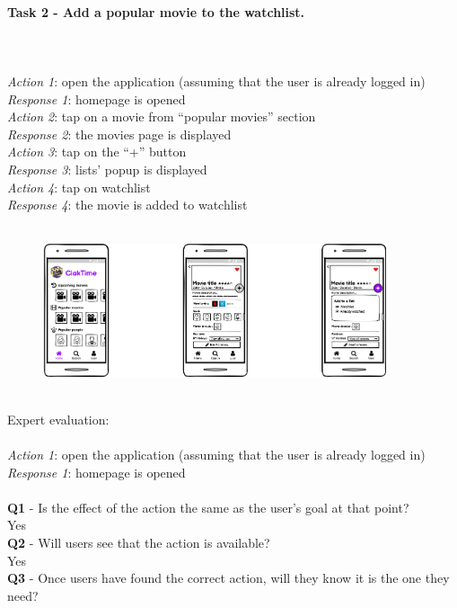 \documentclass[12pt, a4paper]{article}
\numberwithin{figure}{section}
\newcommand\tab[1][1cm]{\hspace*{#1}}
\begin{document}
\paragraph{Task 2 - Add a popular movie to the watchlist.}\mbox{}\\\\
\textit{Action 1}: open the application (assuming that the user is already logged in)\\
\textit{Response 1}: homepage is opened\\
\textit{Action 2}: tap on a movie from “popular movies” section\\
\textit{Response 2}: the movies page is displayed\\
\textit{Action 3}: tap on the “+” button\\
\textit{Response 3}: lists’ popup is displayed\\
\textit{Action 4}: tap on watchlist\\
\textit{Response 4}: the movie is added to watchlist\\\\
\begin{figure}[H]
	\centering
	\includegraphics[width=0.9\textwidth]{images/mockupAdd.png}\\
\end{figure}
\mbox{}\\
\noindent
Expert evaluation:\\\\
\textit{Action 1}: open the application (assuming that the user is already logged in)\\
\textit{Response 1}: homepage is opened\\\\
\textbf{Q1} - Is the effect of the action the same as the user’s goal at that point?\\
\tab Yes\\
\textbf{Q2} - Will users see that the action is available?\\
\tab Yes\\
\textbf{Q3} - Once users have found the correct action, will they know it is the one they need?\\
\end{document}
